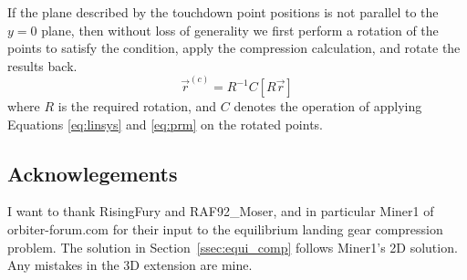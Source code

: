 \documentclass[Orbiter Technical Reference.tex]{subfiles}
\begin{document}
If the plane described by the touchdown point positions is not parallel to the $y=0$ plane, then without loss of generality we first perform a rotation of the points to satisfy the condition, apply the compression calculation, and rotate the results back.
\begin{equation}
\vec{r}^{(c)} = R^{-1} C [R \vec{r}]
\end{equation}
where $R$ is the required rotation, and $C$ denotes the operation of applying Equations \ref{eq:linsys} and \ref{eq:prm} on the rotated points.

\subsection{Acknowlegements}
I want to thank RisingFury and RAF92\_Moser, and in particular Miner1 of orbiter-forum.com for their input to the equilibrium landing gear compression problem. The solution in Section~\ref{ssec:equi_comp} follows Miner1's 2D solution. Any mistakes in the 3D extension are mine.
\end{document}
